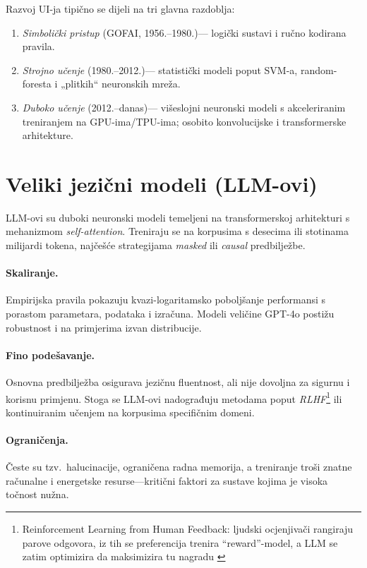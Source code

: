 \documentclass[zavrsnirad]{fer}
\begin{document}
\noindent
Razvoj UI-ja tipično se dijeli na tri glavna razdoblja:
\begin{enumerate}[label=\textbf{\arabic*.}]
  \item \emph{Simbolički pristup} (GOFAI, 1956.–1980.)—
        logički sustavi i ručno kodirana pravila.
  \item \emph{Strojno učenje} (1980.–2012.)—
        statistički modeli poput SVM-a,
        random-foresta i „plitkih“ neuronskih mreža.
  \item \emph{Duboko učenje} (2012.–danas)—
        višeslojni neuronski modeli s
        akceleriranim treniranjem na GPU-ima/TPU-ima; osobito
        konvolucijske i transformerske arhitekture.
\end{enumerate}

\section{Veliki jezični modeli (LLM-ovi)}
\label{subsec:LLM}

LLM-ovi su duboki neuronski modeli temeljeni na
transformerskoj arhitekturi s mehanizmom
\emph{self-attention}.
Treniraju se na korpusima s desecima ili stotinama milijardi
tokena, najčešće strategijama
\emph{masked} ili \emph{causal} predbilježbe.

\paragraph{Skaliranje.}
Empirijska pravila pokazuju
kvazi-logaritamsko poboljšanje performansi s porastom
parametara, podataka i izračuna.
Modeli veličine GPT-4o postižu
robustnost i na primjerima izvan distribucije.

\paragraph{Fino podešavanje.}
Osnovna predbilježba osigurava jezičnu fluentnost, ali
nije dovoljna za sigurnu i korisnu primjenu.
Stoga se LLM-ovi nadograđuju
metodama poput \emph{RLHF}\footnote{Reinforcement Learning from Human Feedback: ljudski ocjenjivači rangiraju parove odgovora, iz tih se preferencija trenira “reward”-model, a LLM se zatim optimizira da maksimizira tu nagradu \cite{christiano2017}} ili kontinuiranim učenjem na
korpusima specifičnim domeni.

\paragraph{Ograničenja.}
Česte su tzv.\ halucinacije,
ograničena radna memorija,
a treniranje troši znatne računalne i energetske resurse—kritični
faktori za sustave kojima je visoka točnost nužna.
\end{document}
